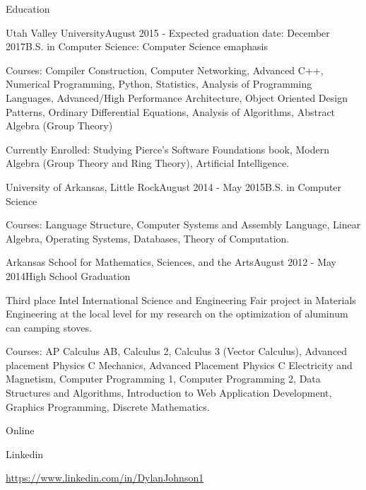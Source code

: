 \documentclass{resume} %
\begin{document}
\begin{rSection}{Education}

\begin{rSubsection}{Utah Valley University}{August 2015 - Expected graduation date: December 2017}{B.S. in Computer Science: Computer Science emaphasis}
\item Courses: Compiler Construction, Computer Networking, Advanced C++, Numerical Programming, Python, Statistics, Analysis of Programming Languages, Advanced/High Performance Architecture, Object Oriented Design Patterns, Ordinary Differential Equations, Analysis of Algorithms, Abstract Algebra (Group Theory)
\item Currently Enrolled: Studying Pierce's Software Foundations book, Modern Algebra (Group Theory and Ring Theory), Artificial Intelligence.
\end{rSubsection}

\begin{rSubsection}{University of Arkansas, Little Rock}{August 2014 - May 2015}{B.S. in Computer Science}
	\item Courses: Language Structure, Computer Systems and Assembly Language, Linear Algebra, Operating Systems, Databases, Theory of Computation.
\end{rSubsection}

\begin{rSubsection}{Arkansas School for Mathematics, Sciences, and the Arts}{August 2012 - May 2014}{High School Graduation}
	\item Third place Intel International Science and Engineering Fair project in Materials Engineering at the local level for my research on the optimization of aluminum can camping stoves.
	\item Courses: AP Calculus AB, Calculus 2, Calculus 3 (Vector Calculus), Advanced placement Physics C Mechanics, Advanced Placement Physics C Electricity and Magnetism, Computer Programming 1, Computer Programming 2, Data Structures and Algorithms, Introduction to Web Application Development, Graphics Programming, Discrete Mathematics.
\end{rSubsection}

\end{rSection}

\begin{rSection}{Online}

\begin{rSubsection}{Linkedin}{}{}{}
	\item {\href{https://www.linkedin.com/in/DylanJohnson1}{https://www.linkedin.com/in/DylanJohnson1}}
\end{rSubsection}

\end{rSection}
\end{document}
